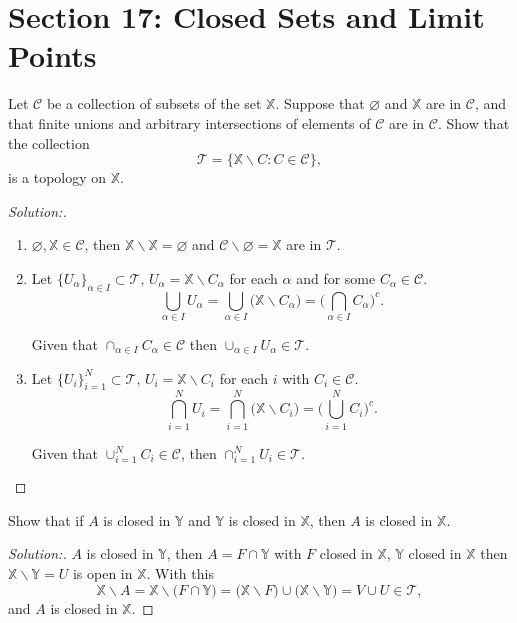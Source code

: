 \documentclass[a4paper,12pt, reqno]{article}
\theoremstyle{definition}
\newenvironment{exerr}[1]{
  \renewcommand\theexeralt{#1}
  \exeralt
}{\endexeralt}
\newenvironment{solution}{\begin{proof}[Solution:]}{\end{proof}}
\newcommand{\T}{\mathscr{T}}
\newcommand{\C}{\mathscr{C}}
\newcommand{\X}{\mathbb{X}}
\newcommand{\Y}{\mathbb{Y}}
\begin{document}
\section*{Section 17: Closed Sets and Limit Points}

\begin{exerr}{1}
  Let $\C$ be a collection of subsets of the set $\X$. Suppose that $\varnothing$ and $\X$ are in $\C$, and that finite unions and arbitrary intersections of elements of $\C$ are in $\C$. Show that the collection
  \begin{equation*}
    \T = \{ \X\backslash C : C\in\C \},
  \end{equation*}
  is a topology on $\X$.
\end{exerr}
\begin{solution}\hfill
  \begin{enumerate}
    \item $\varnothing,\X\in\C$, then $\X\backslash\X = \varnothing$ and $\C\backslash \varnothing=\X$ are in $\T$.
    \item Let $\{ U_{\alpha} \}_{\alpha\in I}\subset\T$, $U_{\alpha} = \X\backslash C_{\alpha}$ for each $\alpha$ and for some $C_{\alpha}\in\C$.
          \begin{equation*}
            \bigcup_{\alpha\in I} U_{\alpha} = \bigcup_{\alpha\in I}\big( \X\backslash C_{\alpha} \big) = \Big( \bigcap_{\alpha\in I}C_{\alpha}  \Big)^c.
          \end{equation*}

          Given that $\cap_{\alpha\in I}C_{\alpha}\in\C$ then $\cup_{\alpha\in I}U_{\alpha}\in\T$.
    \item Let $\{ U_{i} \}_{i=1}^N\subset\T$, $U_{i} = \X\backslash C_{i}$ for each $i$ with $C_{i}\in\C$.
          \begin{equation*}
            \bigcap_{i=1}^N U_{i} = \bigcap_{i=1}^N \big( \X\backslash C_{i} \big) = \Big( \bigcup_{i=1}^N C_{i}\Big)^c.
          \end{equation*}

          Given that $\cup_{i=1}^N C_{i}\in\C$, then $\cap_{i=1}^N U_{i}\in\T$.
  \end{enumerate}
\end{solution}

\begin{exerr}{2}
  Show that if $A$ is closed in $\Y$ and $\Y$ is closed in $\X$, then $A$ is closed in $\X$.
\end{exerr}
\begin{solution}
  $A$ is closed in $\Y$, then $A = F\cap\Y$ with $F$ closed in $\X$, $\Y$ closed in $\X$ then $\X\backslash\Y = U$ is open in $\X$. With this
  \begin{equation*}
    \X\backslash A = \X\backslash\big( F\cap\Y \big) = \big( \X\backslash F \big)\cup\big( \X\backslash\Y \big) = V\cup U \in\T,
  \end{equation*}
  and $A$ is closed in $\X$.
\end{solution}
\end{document}

